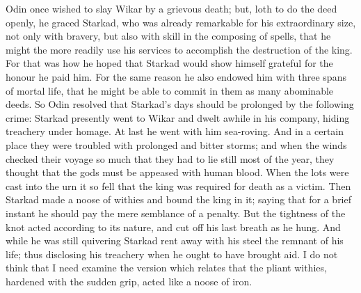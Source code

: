 \documentclass[10pt,a4paper]{report}
\begin{document}
Odin once wished to slay Wikar by a grievous death; but, loth to do the deed openly, he graced Starkad, who was already remarkable for his extraordinary size, not only with bravery, but also with skill in the composing of spells, that he might the more readily use his services to accomplish the destruction of the king. For that was how he hoped that Starkad would show himself grateful for the honour he paid him. For the same reason he also endowed him with three spans of mortal life, that he might be able to commit in them as many abominable deeds. So Odin resolved that Starkad's days should be prolonged by the following crime: Starkad presently went to Wikar and dwelt awhile in his company, hiding treachery under homage. At last he went with him sea-roving. And in a certain place they were troubled with prolonged and bitter storms; and when the winds checked their voyage so much that they had to lie still most of the year, they thought that the gods must be appeased with human blood. When the lots were cast into the urn it so fell that the king was required for death as a victim. Then Starkad made a noose of withies and bound the king in it; saying that for a brief instant he should pay the mere semblance of a penalty. But the tightness of the knot acted according to its nature, and cut off his last breath as he hung. And while he was still quivering Starkad rent away with his steel the remnant of his life; thus disclosing his treachery when he ought to have brought aid. I do not think that I need examine the version which relates that the pliant withies, hardened with the sudden grip, acted like a noose of iron.\\
\end{document}
